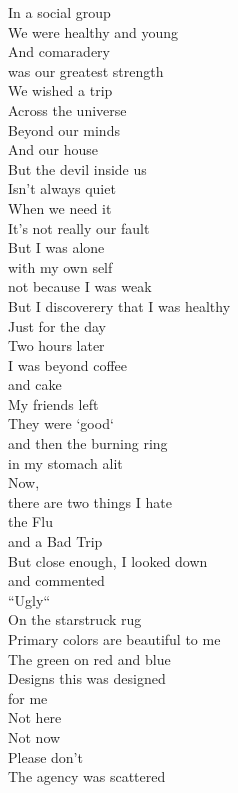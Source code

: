 
In a social group\\
We were healthy and young\\
And comaradery\\
was our greatest strength\\

We wished a trip\\
Across the universe\\
Beyond our minds\\
And our house\\

But the devil inside us\\
Isn't always quiet\\
When we need it\\
It's not really our fault\\

But I was alone\\
with my own self\\
not because I was weak\\
But I discoverery that I was healthy\\

Just for the day\\
Two hours later\\
I was beyond coffee\\
and cake\\

My friends left\\
They were `good`\\
and then the burning ring\\
in my stomach alit\\

Now,\\
there are two things I hate\\
the Flu\\
and a Bad Trip\\

But close enough, I looked down\\
and commented\\
``Ugly``\\
On the starstruck rug\\

Primary colors are beautiful to me\\
The green on red and blue\\
Designs this was designed\\
for me\\

Not here\\
Not now\\
Please don't\\
The agency was scattered\\

